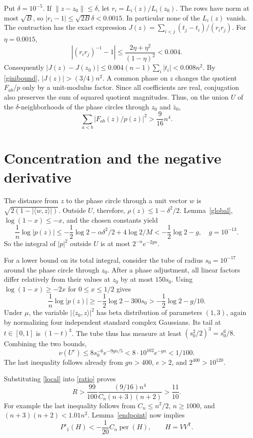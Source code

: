 \documentclass[11pt]{article}
\newcommand{\per}{\operatorname{per}}
\begin{document}
Put $\delta=10^{-5}$. If $\|z-z_0\|\le\delta$, let $r_i=L_i(z)/L_i(z_0)$. The rows have norm at most $\sqrt B$, so $|r_i-1|\le\sqrt{2B}\delta<0.0015$. In particular none of the $L_i(z)$ vanish. The contraction has the exact expression $J(z)=\sum_{i<j}(t_j-t_i)/(r_ir_j)$. For $\eta=0.0015$,
\[
 |(r_ir_j)^{-1}-1|\le\frac{2\eta+\eta^2}{(1-\eta)^2}<0.004.
\]
Consequently $|J(z)-J(z_0)|\le0.004(n-1)\sum_i|t_i|<0.008n^2$. By \eqref{ginibound}, $|J(z)|>(3/4)n^2$. A common phase on $z$ changes the quotient $F_{ab}/p$ only by a unit-modulus factor. Since all coefficients are real, conjugation also preserves the sum of squared quotient magnitudes. Thus, on the union $U$ of the $\delta$-neighborhoods of the phase circles through $z_0$ and $\bar z_0$,
\begin{equation}\label{local}
 \sum_{a<b}|F_{ab}(z)/p(z)|^2>\frac9{16}n^4.
\end{equation}

\section{Concentration and the negative derivative}
The distance from $z$ to the phase circle through a unit vector $w$ is $\sqrt{2(1-|\langle w,z\rangle|)}$. Outside $U$, therefore, $\rho(z)\le1-\delta^2/2$. Lemma~\ref{global}, $\log(1-x)\le-x$, and the chosen constants yield
\[
 \frac1n\log|p(z)|\le-\frac12\log2-\alpha\delta^2/2+4\log2/M
 <-\frac12\log2-g,\quad g=10^{-13}.
\]
So the integral of $|p|^2$ outside $U$ is at most $2^{-n}e^{-2gn}$.

For a lower bound on its total integral, consider the tube of radius $s_0=10^{-17}$ around the phase circle through $z_0$. After a phase adjustment, all linear factors differ relatively from their values at $z_0$ by at most $150s_0$. Using $\log(1-x)\ge-2x$ for $0\le x\le1/2$ gives
\[
 \frac1n\log|p(z)|\ge-\frac12\log2-300s_0>-\frac12\log2-g/10.
\]
Under $\mu$, the variable $|\langle z_0,z\rangle|^2$ has beta distribution of parameters $(1,3)$, again by normalizing four independent standard complex Gaussians. Its tail at $t\in[0,1]$ is $(1-t)^3$. The tube thus has measure at least $(s_0^2/2)^3=s_0^6/8$. Combining the two bounds,
\[
 \nu(U^c)\le 8s_0^{-6}e^{-9gn/5}<8\cdot10^{102}e^{-gn}<1/100.
\]
The last inequality follows already from $gn>400$, $e>2$, and $2^{400}>10^{120}$.

Substituting \eqref{local} into \eqref{ratio} proves
\[
 R>\frac{99}{100}\frac{(9/16)n^4}{C_n(n+3)(n+2)}>\frac{11}{10}.
\]
For example the last inequality follows from $C_n\le n^2/2$, $n\ge1000$, and $(n+3)(n+2)<1.01n^2$. Lemma~\ref{endpoint} now implies
\begin{equation}\label{margin}
 P'_1(H)<-\frac1{20}C_n\per(H),\qquad H=VV^{\mathsf T}.
\end{equation}
\end{document}

